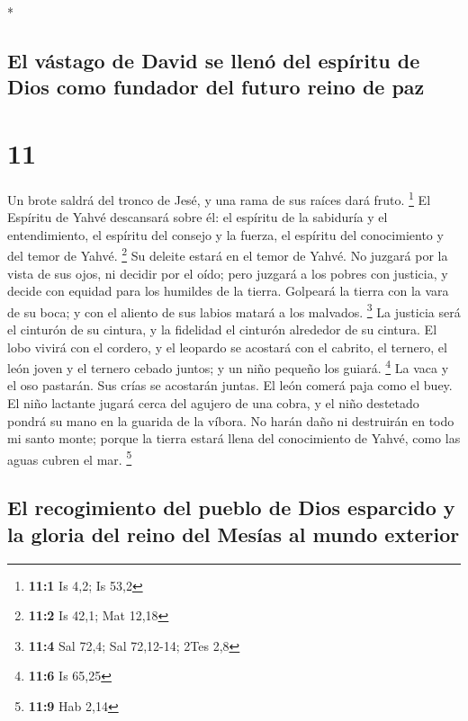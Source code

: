 \begin{paracol}{2}
\switchcolumn[0]*

\hypertarget{el-vuxe1stago-de-david-se-llenuxf3-del-espuxedritu-de-dios-como-fundador-del-futuro-reino-de-paz}{%
\subsection{El vástago de David se llenó del espíritu de Dios como
fundador del futuro reino de
paz}\label{el-vuxe1stago-de-david-se-llenuxf3-del-espuxedritu-de-dios-como-fundador-del-futuro-reino-de-paz}}

\hypertarget{section-20}{%
\section{11}\label{section-20}}

 Un brote saldrá del tronco de Jesé, y una rama de sus
raíces dará fruto. \footnote{\textbf{11:1} Is 4,2; Is 53,2}
 El Espíritu de Yahvé descansará sobre él: el espíritu de
la sabiduría y el entendimiento, el espíritu del consejo y la fuerza, el
espíritu del conocimiento y del temor de Yahvé. \footnote{\textbf{11:2}
  Is 42,1; Mat 12,18}  Su deleite estará en el temor de
Yahvé. No juzgará por la vista de sus ojos, ni decidir por el oído;
 pero juzgará a los pobres con justicia, y decide con
equidad para los humildes de la tierra. Golpeará la tierra con la vara
de su boca; y con el aliento de sus labios matará a los malvados.
\footnote{\textbf{11:4} Sal 72,4; Sal 72,12-14; 2Tes 2,8} 
La justicia será el cinturón de su cintura, y la fidelidad el cinturón
alrededor de su cintura.  El lobo vivirá con el cordero, y
el leopardo se acostará con el cabrito, el ternero, el león joven y el
ternero cebado juntos; y un niño pequeño los guiará. \footnote{\textbf{11:6}
  Is 65,25}  La vaca y el oso pastarán. Sus crías se
acostarán juntas. El león comerá paja como el buey.  El
niño lactante jugará cerca del agujero de una cobra, y el niño destetado
pondrá su mano en la guarida de la víbora.  No harán daño
ni destruirán en todo mi santo monte; porque la tierra estará llena del
conocimiento de Yahvé, como las aguas cubren el mar. \footnote{\textbf{11:9}
  Hab 2,14}

\hypertarget{el-recogimiento-del-pueblo-de-dios-esparcido-y-la-gloria-del-reino-del-mesuxedas-al-mundo-exterior}{%
\subsection{El recogimiento del pueblo de Dios esparcido y la gloria del
reino del Mesías al mundo
exterior}\label{el-recogimiento-del-pueblo-de-dios-esparcido-y-la-gloria-del-reino-del-mesuxedas-al-mundo-exterior}}


\end{paracol}
